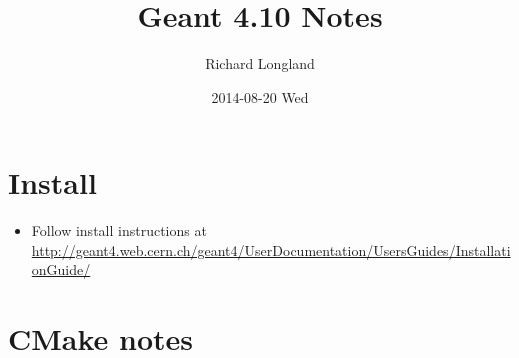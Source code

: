 \documentclass[11pt]{article}
\author{Richard Longland}
\date{2014-08-20 Wed}
\title{Geant 4.10 Notes}
\begin{document}
\maketitle

\section{Install}
\label{sec-1}
\begin{itemize}
\item Follow install instructions at
    \url{http://geant4.web.cern.ch/geant4/UserDocumentation/UsersGuides/InstallationGuide/}
\end{itemize}
\section{CMake notes}
\label{sec-2}
\end{document}
